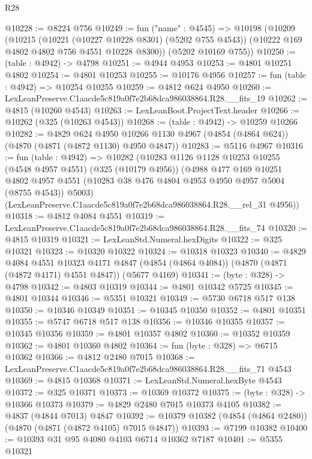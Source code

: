 \begin{lexlean}{R28}
\begin{coremodule}
@10228 := @8224 @756
@10249 := fun ("name" : @4545) =>
  @10198
    (@10209
      (@10215
        (@10221 (@10227 @10228 @8301) (@5202 @755 @4543))
        (@10222 @169 @4802 @4802 @756 @4551 @10228 @8300))
      (@5202 @10169 @755))
@10250 := (table : @4942) -> @4798
@10251 := @4944 @4953
@10253 := @4801 @10251 @4802
@10254 := @4801 @10253
@10255 := @10176 @4956
@10257 := fun (table : @4942) => @10254 @10255
@10259 := @4812 @624 @4950
@10260 := LexLeanPreserve.C1aacde5c819a0f7e2b68dca986038864.R28.__fits_19
@10262 := @4815 (@10260 @4543)
@10263 := LexLeanBoot.ProjectText.header
@10266 := @10262 (@325 (@10263 @4543))
@10268 := (table : @4942) -> @10259 @10266
@10282 := @4829
    @624
    @4950
    @10266
    @1130
    @4967
    (@4854 (@4864 @624))
    (@4870 (@4871 (@4872 @1130) @4950 @4847))
@10283 := @5116 @4967
@10316 := fun (table : @4942) =>
  @10282
    (@10283
      @1126
      @1128
      @10253
      @10255
      (@4548 @4957 @4551)
      (@325 (@10179 @4956))
      (@4988
        @477
        @169
        @10251
        @4802
        @4957
        @4551
        (@10283 @38 @476 @4804 @4953 @4950 @4957 @5004 (@8755 @4543))
        @5003)
      (LexLeanPreserve.C1aacde5c819a0f7e2b68dca986038864.R28.__rel_31 @4956))
@10318 := @4812 @4084 @4551
@10319 := LexLeanPreserve.C1aacde5c819a0f7e2b68dca986038864.R28.__fits_74
@10320 := @4815 @10319
@10321 := LexLeanStd.Numeral.hexDigits
@10322 := @325 @10321
@10323 := @10320 @10322
@10324 := @10318 @10323
@10340 := @4829
    @4084
    @4551
    @10323
    @4171
    @4847
    (@4854 (@4864 @4084))
    (@4870 (@4871 (@4872 @4171) @4551 @4847))
    (@5677 @4169)
@10341 := (byte : @328) -> @4798
@10342 := @4803 @10319
@10344 := @4801 @10342 @5725
@10345 := @4801 @10344
@10346 := @5351 @10321
@10349 := @5730 @6718 @517 @138
@10350 := @10346 @10349
@10351 := @10345 @10350
@10352 := @4801 @10351
@10355 := @5747 @6718 @517 @138
@10356 := @10346 @10355
@10357 := @10345 @10356
@10359 := @4801 @10357 @4802
@10360 := @10352 @10359
@10362 := @4801 @10360 @4802
@10364 := fun (byte : @328) => @6715 @10362
@10366 := @4812 @2480 @7015
@10368 := LexLeanPreserve.C1aacde5c819a0f7e2b68dca986038864.R28.__fits_71 @4543
@10369 := @4815 @10368
@10371 := LexLeanStd.Numeral.hexByte @4543
@10372 := @325 @10371
@10373 := @10369 @10372
@10375 := (byte : @328) -> @10366 @10373
@10379 := @4829 @2480 @7015 @10373 @4105
@10382 := @4837 (@4844 @7013) @4847
@10392 := @10379 @10382 (@4854 (@4864 @2480)) (@4870 (@4871 (@4872 @4105) @7015 @4847))
@10393 := @7199 @10382
@10400 := @10393 @31 @95 @4080 @4103 @6714 @10362 @7187
@10401 := @5355 @10321

\end{coremodule}
\end{lexlean}
